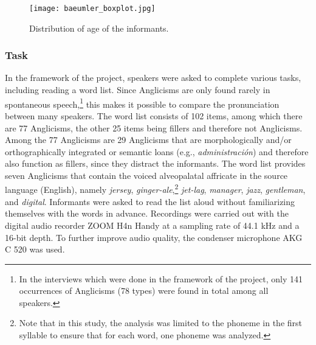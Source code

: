 \documentclass[output=paper]{langscibook}
\begin{document}
\begin{figure}
\centering
\texttt{[image: baeumler\_boxplot.jpg]}
\caption{Distribution of age of the informants.}
\label{baumler:fig:box}
\end{figure}

\subsubsection{Task}\label{baumler:sec:task}
In the framework of the project, speakers were asked to complete various tasks, including reading a word list. Since Anglicisms are only found rarely in spontaneous speech,\footnote{In the interviews which were done in the framework of the project, only 141 occurrences of Anglicisms (78 types) were found in total among all speakers.} this makes it possible to compare the pronunciation between many speakers.
The word list consists of 102 items, among which there are 77 Anglicisms, the other 25 items being fillers and therefore not Anglicisms. Among the 77 Anglicisms are 29 Anglicisms that are morphologically and/or orthographically integrated or semantic loans (e.g., \textit{administración}) and therefore also function as fillers, since they distract the informants. 
The word list provides seven Anglicisms that contain the voiced alveopalatal affricate in the source language (English), namely \textit{jersey}, \textit{ginger-ale},\footnote{Note that in this study, the analysis was limited to the phoneme in the first syllable to ensure that for each word, one phoneme was analyzed.} \textit{jet-lag}, \textit{manager}, \textit{jazz}, \textit{gentleman}, and \textit{digital}.
Informants were asked to read the list aloud without familiarizing themselves with the words in advance. 
Recordings were carried out with the digital audio recorder ZOOM H4n Handy at a sampling rate of 44.1 kHz and a 16-bit depth. To further improve audio quality, the condenser microphone AKG C 520 was used.
\end{document}
